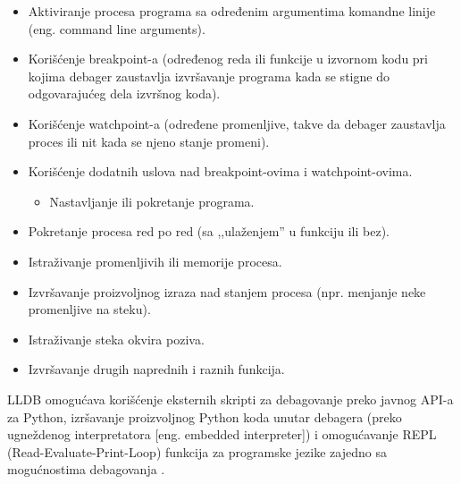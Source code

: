 \documentclass[a4paper]{article}
\begin{document}
\begin{itemize}
	\item{Aktiviranje procesa programa sa određenim argumentima komandne linije
		(eng. command line arguments).}
	
	\item{Korišćenje breakpoint-a (određenog reda ili funkcije u izvornom kodu pri
		kojima debager zaustavlja izvršavanje programa kada se stigne do odgovarajućeg
		dela izvršnog koda).}
	
	\item{Korišćenje watchpoint-a (određene promenljive, takve da debager zaustavlja
		proces ili nit kada se njeno stanje promeni).}
	
	\item{Korišćenje dodatnih uslova nad breakpoint-ovima i watchpoint-ovima.}
	\begin{itemize}
		\item{Nastavljanje ili pokretanje programa.}
	\end{itemize}
	
	\item{Pokretanje procesa red po red (sa ,,ulaženjem'' u funkciju ili bez).}
	
	\item{Istraživanje promenljivih ili memorije procesa.}
	
	\item{Izvršavanje proizvoljnog izraza nad stanjem procesa (npr. menjanje neke
		promenljive na steku).}
	
	\item{Istraživanje steka okvira poziva.}
	
	\item{Izvršavanje drugih naprednih i raznih funkcija.}
\end{itemize}

LLDB omogućava korišćenje eksternih skripti za debagovanje preko javnog API-a za Python, izršavanje proizvoljnog Python koda unutar debagera \cite{lldb_python} (preko ugneždenog interpretatora [eng. embedded interpreter]) i omogućavanje REPL (Read-Evaluate-Print-Loop) funkcija za programske jezike zajedno sa mogućnostima debagovanja \cite{swift_lldb_repl}.
\end{document}
